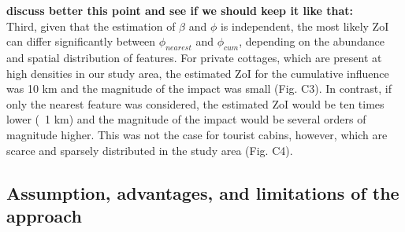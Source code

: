 \documentclass[titlepage]{article}
\begin{document}
\textbf{discuss better this point and see if we should keep it like that:} \\
Third, given that the estimation of $\beta$ and $\phi$ is independent, the most likely ZoI can differ significantly between $\phi_{nearest}$ and $\phi_{cum}$, depending on the abundance and spatial distribution of features. For private cottages, which are present at high densities in our study area, the estimated ZoI for the cumulative influence was 10 km and the magnitude of the impact was small (Fig. C3). In contrast, if only the nearest feature was considered, the estimated ZoI would be ten times lower (~1 km) and the magnitude of the impact would be several orders of magnitude higher. This was not the case for tourist cabins, however, which are scarce and sparsely distributed in the study area (Fig. C4).    


\subsection{Assumption, advantages, and limitations of the approach}
\end{document}
